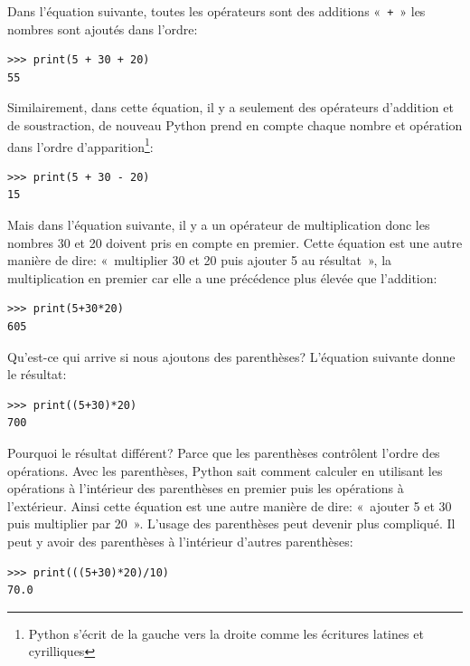 Dans l'équation suivante, toutes les opérateurs sont des additions «~\texttt{+}~» les nombres sont ajoutés dans l'ordre:

\begin{Verbatim}[frame=single,rulecolor=\color{mbleu}, label=à taper]
>>> print(5 + 30 + 20)
55
\end{Verbatim}


Similairement, dans cette équation, il y a seulement des opérateurs d'addition et de soustraction, de nouveau Python prend en compte chaque nombre et opération dans l'ordre d'ap\-pa\-ri\-tion\footnote{Python s'écrit de la gauche vers la droite comme les écritures latines et cyrilliques}:

\begin{Verbatim}[frame=single,rulecolor=\color{mbleu}, label=à taper]
>>> print(5 + 30 - 20)
15
\end{Verbatim}
\rm

Mais dans l'équation suivante, il y a un opérateur de multiplication donc les nombres 30 et 20 doivent pris en compte en premier. Cette équation est une autre manière de dire: «~multiplier 30 et 20 puis ajouter 5 au résultat~», la multiplication en premier car elle a une précédence plus élevée que l'addition:

\begin{Verbatim}[frame=single,rulecolor=\color{mbleu}, label=à taper]
>>> print(5+30*20)
605
\end{Verbatim}


Qu'est-ce qui arrive si nous ajoutons des parenthèses? L'équation suivante donne le résultat:

\begin{Verbatim}[frame=single,rulecolor=\color{mbleu}, label=à taper]
>>> print((5+30)*20)
700
\end{Verbatim}
\rm

Pourquoi le résultat différent? Parce que les parenthèses contrôlent l'ordre des opérations. Avec les parenthèses, Python sait comment calculer en utilisant les opérations à l'intérieur des parenthèses en premier puis les opérations à l'extérieur.
Ainsi cette équation est une autre manière de dire: «~ajouter 5 et 30 puis multiplier par 20~». L'usage des parenthèses peut devenir plus compliqué. Il peut y avoir des parenthèses à l'intérieur d'autres parenthèses:

\begin{Verbatim}[frame=single,rulecolor=\color{mbleu}, label=à taper]
>>> print(((5+30)*20)/10)
70.0
\end{Verbatim}


